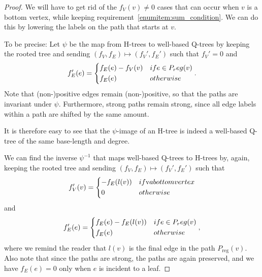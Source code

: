 \documentclass[10pt,a4paper]{amsart}
\begin{document}
\begin{proof} 
    We will have to get rid of the $f_V(v)\neq0$ cases that can occur when $v$ is a bottom vertex, while keeping requirement~\ref{enumitem:sum_condition}. 
    We can do this by lowering the labels on the path that starts at $v$.  

    To be precise: 
    Let $\psi$ be the map from H-trees to well-based Q-trees by keeping the rooted tree and sending $(f_V,f_E)\mapsto (f_V',f_E')$ such that $f_V'=0$ and
    \begin{align}
        f_E'(e)=\begin{dcases}
            f_E(e) - f_V(v) &\textrm{ if } e\in P_\textrm{reg}(v)\\
            f_E(e)          &\textrm{ otherwise}
        \end{dcases}.
    \end{align}
    Note that (non-)positive edges remain (non-)positive, so that the paths are invariant under $\psi$. 
    Furthermore, strong paths remain strong, since all edge labels within a path are shifted by the same amount.
    
    It is therefore easy to see that the $\psi$-image of an H-tree is indeed a well-based Q-tree of the same base-length and degree.

    We can find the inverse $\psi^{-1}$ that maps well-based Q-trees to H-trees by, again, keeping the rooted tree and sending $(f_V,f_E)\mapsto (f_V',f_E')$ such that 
    \begin{align}
        f_V'(v)=\begin{dcases}
            -f_E(l(v)) & \textrm{ if $v$ a bottom vertex}\\  
            0 & \textrm{ otherwise}
        \end{dcases}
    \end{align}
    and
    \begin{align}
        f_E'(e)=\begin{dcases}
            f_E(e) - f_E(l(v)) &\textrm{ if } e\in P_\textrm{reg}(v)\\
            f_E(e)          &\textrm{ otherwise}
        \end{dcases},
    \end{align}
    where we remind the reader that $l(v)$ is the final edge in the path $P_\textrm{reg}(v)$.
    Also note that since the paths are strong, the paths are again preserved, and we have $f_E(e)=0$ only when $e$ is incident to a leaf.
\end{proof}
\end{document}
